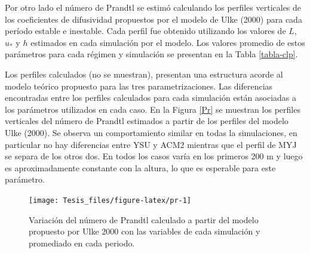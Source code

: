\documentclass[12pt,spanish,oneside, a4paper]{book}
\begin{document}
Por otro lado el número de Prandtl se estimó calculando los perfiles
verticales de los coeficientes de difusividad propuestos por el modelo
de Ulke (2000) para cada período estable e inestable. Cada perfil fue
obtenido utilizando los valores de \(L\), \(u_*\) y \(h\) estimados en
cada simulación por el modelo. Los valores promedio de estos parámetros
para cada régimen y simulación se presentan en la Tabla \ref{tabla-clp}.

Los perfiles calculados (no se muestran), presentan una estructura
acorde al modelo teórico propuesto para las tres parametrizaciones. Las
diferencias encontradas entre los perfiles calculados para cada
simulación están asociadas a los parámetros utilizados en cada caso. En
la Figura \ref{Pr} se muestran los perfiles verticales del número de
Prandtl estimados a partir de los perfiles del modelo Ulke (2000). Se
observa un comportamiento similar en todas la simulaciones, en
particular no hay diferencias entre YSU y ACM2 mientras que el perfil de
MYJ se separa de los otros dos. En todos los casos varía en los primeros
200 m y luego es aproximadamente constante con la altura, lo que es
esperable para este parámetro.

\begin{figure}

{\centering \texttt{[image: Tesis\_files/figure-latex/pr-1]} 

}

\caption{Variación del número de Prandtl calculado a partir del modelo propuesto por Ulke 2000 con las variables de cada simulación y promediado en cada periodo. \label{Pr}}\label{fig:pr}
\end{figure}
\end{document}
